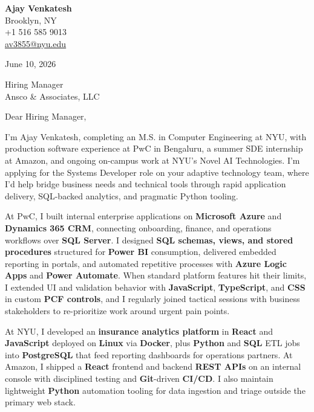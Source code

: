 \documentclass[letterpaper,11pt]{article}
\begin{document}
\begin{flushleft}
\textbf{\large Ajay Venkatesh} \\
Brooklyn, NY \\
+1 516 585 9013 \\
\href{mailto:av3855@nyu.edu}{av3855@nyu.edu}
\end{flushleft}
\vspace{10pt}
June 10, 2026
\vspace{6pt}

Hiring Manager \\
Ansco \& Associates, LLC

\vspace{10pt}

Dear Hiring Manager,

I'm Ajay Venkatesh, completing an M.S. in Computer Engineering at NYU, with production software experience at PwC in Bengaluru, a summer SDE internship at Amazon, and ongoing on-campus work at NYU's Novel AI Technologies. I'm applying for the Systems Developer role on your adaptive technology team, where I'd help bridge business needs and technical tools through rapid application delivery, SQL-backed analytics, and pragmatic Python tooling.

At PwC, I built internal enterprise applications on \textbf{Microsoft Azure} and \textbf{Dynamics 365 CRM}, connecting onboarding, finance, and operations workflows over \textbf{SQL Server}. I designed \textbf{SQL schemas, views, and stored procedures} structured for \textbf{Power BI} consumption, delivered embedded reporting in portals, and automated repetitive processes with \textbf{Azure Logic Apps} and \textbf{Power Automate}. When standard platform features hit their limits, I extended UI and validation behavior with \textbf{JavaScript}, \textbf{TypeScript}, and \textbf{CSS} in custom \textbf{PCF controls}, and I regularly joined tactical sessions with business stakeholders to re-prioritize work around urgent pain points.

At NYU, I developed an \textbf{insurance analytics platform} in \textbf{React} and \textbf{JavaScript} deployed on \textbf{Linux} via \textbf{Docker}, plus \textbf{Python} and \textbf{SQL} ETL jobs into \textbf{PostgreSQL} that feed reporting dashboards for operations partners. At Amazon, I shipped a \textbf{React} frontend and backend \textbf{REST APIs} on an internal console with disciplined testing and \textbf{Git}-driven \textbf{CI/CD}. I also maintain lightweight \textbf{Python} automation tooling for data ingestion and triage outside the primary web stack.
\end{document}
